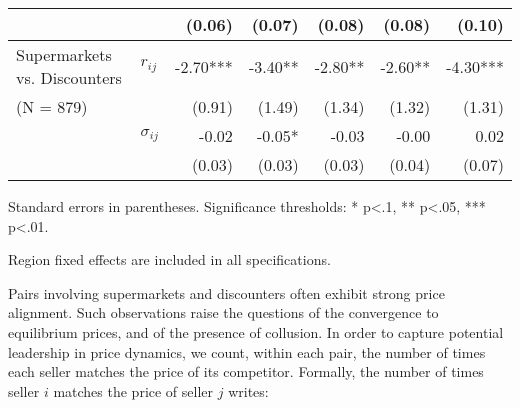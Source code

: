 \documentclass[english]{article}
\begin{document}
\begin{table}
\begin{threeparttable}
\begin{tabular}{llrrrrr}
          &       & (0.06) & (0.07) & (0.08) & (0.08) & (0.10) \\
\midrule
    \multicolumn{1}{l}{Supermarkets vs. Discounters} & \multicolumn{1}{l}{$r_{ij}$} & -2.70*** & -3.40** & -2.80** & -2.60** & -4.30*** \\
    \multicolumn{1}{l}{(N = 879)} &       & (0.91) & (1.49) & (1.34) & (1.32) & (1.31) \\
          & \multicolumn{1}{l}{$\sigma_{ij}$} & -0.02 & -0.05* & -0.03 & -0.00 & 0.02 \\
          &       & (0.03) & (0.03) & (0.03) & (0.04) & (0.07) \\
\bottomrule
\bottomrule
\end{tabular}
\begin{tablenotes}
      \small
      \item Standard errors in parentheses. Significance thresholds: * p<.1, ** p<.05, *** p<.01.
      \item Region fixed effects are included in all specifications.
\end{tablenotes}
\end{threeparttable}
\end{table}

Pairs involving supermarkets and discounters often exhibit strong price alignment. Such observations raise the questions of the convergence to equilibrium prices, and of the presence of collusion. In order to capture potential leadership in price dynamics, we count, within each pair, the number of times each seller matches the price of its competitor. Formally, the number of times seller $i$ matches the price of seller $j$ writes:
\end{document}

